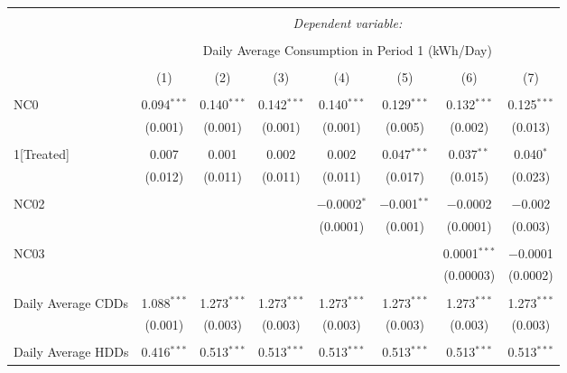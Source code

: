 
\begin{table}[!htbp] \centering 
  \caption{} 
  \label{} 
\small 
\begin{tabular}{@{\extracolsep{5pt}}lccccccc} 
\\[-1.8ex]\hline 
\hline \\[-1.8ex] 
 & \multicolumn{7}{c}{\textit{Dependent variable:}} \\ 
\cline{2-8} 
\\[-1.8ex] & \multicolumn{7}{c}{Daily Average Consumption in Period 1 (kWh/Day)} \\ 
\\[-1.8ex] & (1) & (2) & (3) & (4) & (5) & (6) & (7)\\ 
\hline \\[-1.8ex] 
 NC0 & 0.094$^{***}$ & 0.140$^{***}$ & 0.142$^{***}$ & 0.140$^{***}$ & 0.129$^{***}$ & 0.132$^{***}$ & 0.125$^{***}$ \\ 
  & (0.001) & (0.001) & (0.001) & (0.001) & (0.005) & (0.002) & (0.013) \\ 
  & & & & & & & \\ 
 1[Treated] & 0.007 & 0.001 & 0.002 & 0.002 & 0.047$^{***}$ & 0.037$^{**}$ & 0.040$^{*}$ \\ 
  & (0.012) & (0.011) & (0.011) & (0.011) & (0.017) & (0.015) & (0.023) \\ 
  & & & & & & & \\ 
 NC02 &  &  &  & $-$0.0002$^{*}$ & $-$0.001$^{**}$ & $-$0.0002 & $-$0.002 \\ 
  &  &  &  & (0.0001) & (0.001) & (0.0001) & (0.003) \\ 
  & & & & & & & \\ 
 NC03 &  &  &  &  &  & 0.0001$^{***}$ & $-$0.0001 \\ 
  &  &  &  &  &  & (0.00003) & (0.0002) \\ 
  & & & & & & & \\ 
 Daily Average CDDs & 1.088$^{***}$ & 1.273$^{***}$ & 1.273$^{***}$ & 1.273$^{***}$ & 1.273$^{***}$ & 1.273$^{***}$ & 1.273$^{***}$ \\ 
  & (0.001) & (0.003) & (0.003) & (0.003) & (0.003) & (0.003) & (0.003) \\ 
  & & & & & & & \\ 
 Daily Average HDDs & 0.416$^{***}$ & 0.513$^{***}$ & 0.513$^{***}$ & 0.513$^{***}$ & 0.513$^{***}$ & 0.513$^{***}$ & 0.513$^{***}$ \\ 

\end{tabular}
\end{table}
